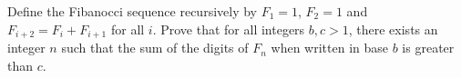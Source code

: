 Define the Fibanocci sequence recursively by $F_1=1$, $F_2=1$ and $F_{i+2} = F_i + F_{i+1}$ for all $i$.  Prove that for all integers $b,c>1$, there exists an integer $n$ such that the sum of the digits of $F_n$ when written in base $b$ is greater than $c$.

